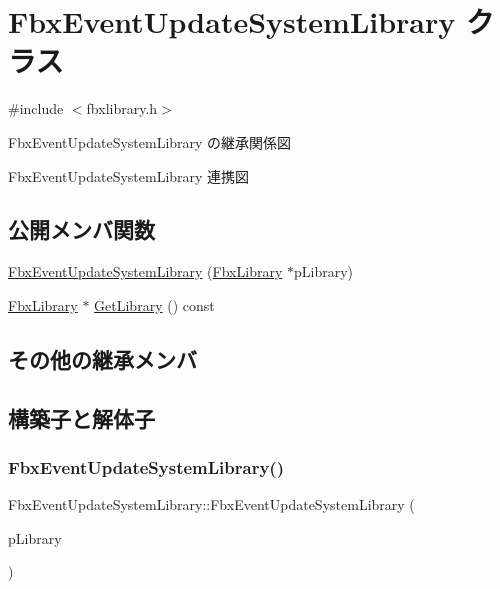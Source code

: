 \hypertarget{class_fbx_event_update_system_library}{}\section{Fbx\+Event\+Update\+System\+Library クラス}
\label{class_fbx_event_update_system_library}


{\ttfamily \#include $<$fbxlibrary.\+h$>$}



Fbx\+Event\+Update\+System\+Library の継承関係図


Fbx\+Event\+Update\+System\+Library 連携図
\subsection*{公開メンバ関数}
\begin{DoxyCompactItemize}
\item 
\hyperlink{class_fbx_event_update_system_library_a1b45029571ddf6bf090d9c4c04f3b8bd}{Fbx\+Event\+Update\+System\+Library} (\hyperlink{class_fbx_library}{Fbx\+Library} $\ast$p\+Library)
\item 
\hyperlink{class_fbx_library}{Fbx\+Library} $\ast$ \hyperlink{class_fbx_event_update_system_library_a216f7eb4fed21eeac1aa0398fb164288}{Get\+Library} () const
\end{DoxyCompactItemize}
\subsection*{その他の継承メンバ}


\subsection{構築子と解体子}
\mbox{\label{class_fbx_event_update_system_library_a1b45029571ddf6bf090d9c4c04f3b8bd}} 
\subsubsection{\texorpdfstring{Fbx\+Event\+Update\+System\+Library()}{FbxEventUpdateSystemLibrary()}}
{\footnotesize\ttfamily Fbx\+Event\+Update\+System\+Library\+::\+Fbx\+Event\+Update\+System\+Library (\begin{DoxyParamCaption}\item[{\hyperlink{class_fbx_library}{Fbx\+Library} $\ast$}]{p\+Library }\end{DoxyParamCaption})}




